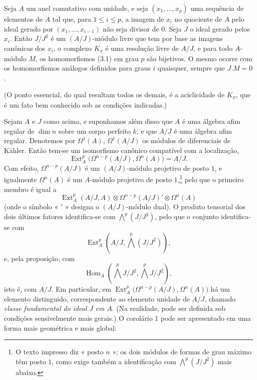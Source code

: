 Seja $A$ um anel comutativo com unidade, e seja
$(x_1,\ldots,x_p)$ uma sequência de elementos de $A$ tal que, para $1\leq i\leq p$,
a imagem de $x_i$ no quociente de $A$ pelo ideal gerado por
$(x_1,\ldots,x_{i-1})$ não seja divisor de $0$. Seja $J$ o ideal gerado
pelos $x_i$. Então $J/J^{2}$ é um $(A/J)$-módulo livre que tem por base as
imagens canônicas dos $x_i$, o complexo $K_{\underline{x}}$ é uma resolução
livre de $A/J$, e para todo $A$-módulo $M$, os homomorfismos (3.1) em
grau $p$ são bijetivos. O mesmo ocorre com os homomorfismos análogos
definidos para graus $i$ quaisquer, sempre que $J.M=0$.

(O ponto essencial, do qual resultam todos os demais, é a aciclicidade de
$K_{\underline{x}}$, que é um fato bem conhecido sob as condições indicadas.)

 Sejam $A$ e $J$ como acima, e suponhamos além disso que
$A$ é uma álgebra afim regular de $\dim n$ sobre um corpo perfeito $k$, e
que $A/J$ é uma álgebra afim regular. Denotemos por $\Omega^{1}(A)$,
$\Omega^{1}(A/J)$ os módulos de diferenciais de Kähler. Então tem-se um
isomorfismo canônico compatível com a localização,
\begin{equation}\tag{3.5}
  \operatorname{Ext}_{A}^{p}\bigl(\Omega^{n-p}(A/J),\Omega^{n}(A)\bigr)=A/J.
\end{equation}
Com efeito, $\Omega^{n-p}(A/J)$ é um $(A/J)$-módulo projetivo de posto $1$, e igualmente
$\Omega^{n}(A)$ é um $A$-módulo projetivo de posto $1$,\footnote{O texto impresso
diz « posto $n$ »; os dois módulos de formas de grau máximo têm posto
$1$, como exige também a identificação com $\bigwedge^{p}(J/J^{2})$ mais abaixo.}
pelo que o primeiro membro é igual a
\[
  \operatorname{Ext}_{A}^{p}(A/J,A)
  \otimes\Omega^{n-p}(A/J)'\otimes\Omega^{n}(A)
\]
(onde o símbolo « $'$ » designa o $(A/J)$-módulo dual). O produto tensorial dos
dois últimos fatores identifica-se com $\bigwedge^{p}(J/J^{2})$, pelo que o conjunto
identifica-se com
\[
  \operatorname{Ext}_{A}^{p}\!\left(A/J,\bigwedge^{p}(J/J^{2})\right),
\]
e, pela proposição, com
\[
  \operatorname{Hom}_{A}\!\left(\bigwedge^{p}J/J^{2},
  \bigwedge^{p}J/J^{2}\right),
\]
isto é, com $A/J$. Em particular, em
$\operatorname{Ext}_{A}^{p}\bigl(\Omega^{n-p}(A/J),\Omega^{n}(A)\bigr)$ há um
elemento distinguido, correspondente ao elemento unidade de $A/J$, chamado
\emph{classe fundamental do ideal $J$ em $A$}. (Na realidade, pode
ser definida sob condições sensivelmente mais gerais.) O
corolário 1 pode ser apresentado em uma forma mais geométrica e mais global:

